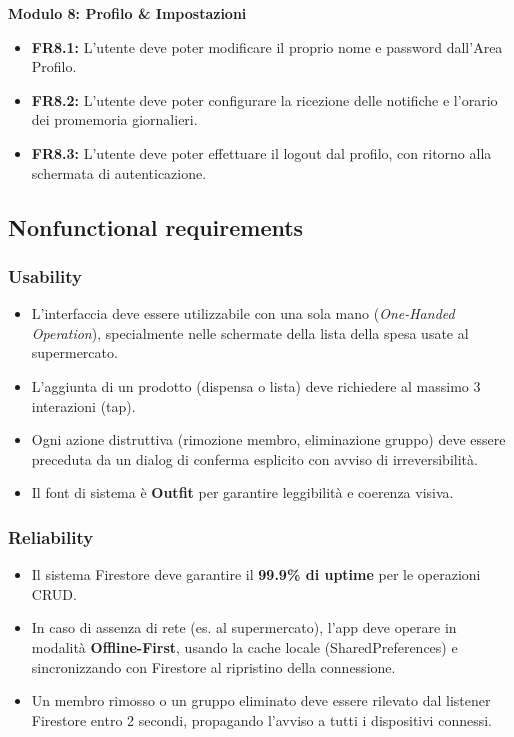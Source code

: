 \documentclass[12pt,a4paper]{article}
\begin{document}
\textbf{Modulo 8: Profilo \& Impostazioni}
\begin{itemize}
    \item \textbf{FR8.1:} L'utente deve poter modificare il proprio nome e password dall'Area Profilo.
    \item \textbf{FR8.2:} L'utente deve poter configurare la ricezione delle notifiche e l'orario dei promemoria giornalieri.
    \item \textbf{FR8.3:} L'utente deve poter effettuare il logout dal profilo, con ritorno alla schermata di autenticazione.
\end{itemize}

\subsection{Nonfunctional requirements}

\subsubsection{Usability}
\begin{itemize}
    \item L'interfaccia deve essere utilizzabile con una sola mano (\textit{One-Handed Operation}), specialmente nelle schermate della lista della spesa usate al supermercato.
    \item L'aggiunta di un prodotto (dispensa o lista) deve richiedere al massimo 3 interazioni (tap).
    \item Ogni azione distruttiva (rimozione membro, eliminazione gruppo) deve essere preceduta da un dialog di conferma esplicito con avviso di irreversibilità.
    \item Il font di sistema è \textbf{Outfit} per garantire leggibilità e coerenza visiva.
\end{itemize}

\subsubsection{Reliability}
\begin{itemize}
    \item Il sistema Firestore deve garantire il \textbf{99.9\% di uptime} per le operazioni CRUD.
    \item In caso di assenza di rete (es. al supermercato), l'app deve operare in modalità \textbf{Offline-First}, usando la cache locale (SharedPreferences) e sincronizzando con Firestore al ripristino della connessione.
    \item Un membro rimosso o un gruppo eliminato deve essere rilevato dal listener Firestore entro 2 secondi, propagando l'avviso a tutti i dispositivi connessi.
\end{itemize}
\end{document}
